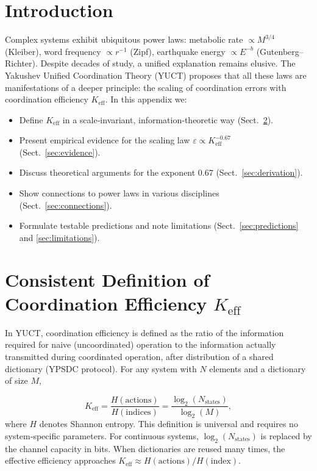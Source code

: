 \documentclass[12pt]{article}
\newcommand{\Keff}{K_{\mathrm{eff}}}
\newcommand{\eps}{\varepsilon}
\begin{document}
	\tableofcontents
	\newpage
	
	\section{Introduction}
	Complex systems exhibit ubiquitous power laws: metabolic rate \(\propto M^{3/4}\) (Kleiber), word frequency \(\propto r^{-1}\) (Zipf), earthquake energy \(\propto E^{-b}\) (Gutenberg–Richter). Despite decades of study, a unified explanation remains elusive. The Yakushev Unified Coordination Theory (YUCT) proposes that all these laws are manifestations of a deeper principle: the scaling of coordination errors with coordination efficiency \(\Keff\). In this appendix we:
	\begin{itemize}
		\item Define \(\Keff\) in a scale‑invariant, information‑theoretic way (Sect.~\ref{sec:keff}).
		\item Present empirical evidence for the scaling law \(\eps \propto \Keff^{-0.67}\) (Sect.~\ref{sec:evidence}).
		\item Discuss theoretical arguments for the exponent \(0.67\) (Sect.~\ref{sec:derivation}).
		\item Show connections to power laws in various disciplines (Sect.~\ref{sec:connections}).
		\item Formulate testable predictions and note limitations (Sect.~\ref{sec:predictions} and \ref{sec:limitations}).
	\end{itemize}
	
	\section{Consistent Definition of Coordination Efficiency \(\Keff\)}
	\label{sec:keff}
	
	In YUCT, coordination efficiency is defined as the ratio of the information required for naive (uncoordinated) operation to the information actually transmitted during coordinated operation, after distribution of a shared dictionary (YPSDC protocol). For any system with \(N\) elements and a dictionary of size \(M\),
	
	\begin{equation}
		\Keff = \frac{H(\text{actions})}{H(\text{indices})} = \frac{\log_2(N_{\text{states}})}{\log_2(M)},
		\label{eq:keff}
	\end{equation}
	where \(H\) denotes Shannon entropy. This definition is universal and requires no system‑specific parameters. For continuous systems, \(\log_2(N_{\text{states}})\) is replaced by the channel capacity in bits. When dictionaries are reused many times, the effective efficiency approaches \(\Keff \approx H(\text{actions})/H(\text{index})\).
	
\end{document}
